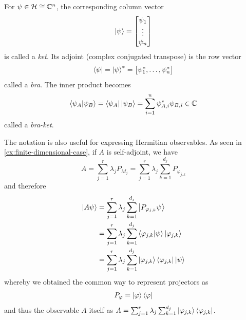 For $\psi \in \mathcal{H} \cong \mathbb{C}^n$, the corresponding column vector
\[
\ket{\psi}
=
\begin{bmatrix}
\psi_1 \\
\vdots \\
\psi_n
\end{bmatrix}
\]
is called a \emph{ket}.
Its adjoint (complex conjugated transpose) is the row vector
\[
\bra{\psi}
=
\ket{\psi}^*
=
\begin{bmatrix}
\psi_1^*,
\ldots, 
\psi_n^* 
\end{bmatrix}
\]
called a \emph{bra}.
The inner product becomes
\[
\braket{\psi_{A} | \psi_{B}}
=
\bra{\psi_{A}}  \ket{\psi_{B}}
=
\sum_{i=1}^n \psi_{A,i}^* \psi_{B,i}
\in \mathbb{C}
\]
called a \emph{bra-ket}.








The notation is also useful for expressing Hermitian observables.
As seen in \autoref{ex:finite-dimensional-case}, if $A$ is self-adjoint, we have
\[
A
=
\sum_{j=1}^r \lambda_j P_{M_j} 
=
\sum_{j=1}^r \lambda_j \sum_{k=1}^{d_j} P_{\varphi_{j,k}}
\]
and therefore
\[
\begin{aligned}
\ket{A \psi}
&=
\sum_{\smash[b]{j}=1}^r \lambda_j \sum_{k=1}^{d_j} \Ket{P_{\varphi_{j,k}} \psi} \\
&=
\sum_{\smash[b]{j}=1}^r \lambda_j \sum_{k=1}^{d_j} \braket{\varphi_{j,k}|\psi} \ket{\varphi_{j,k}} \\
&=
\sum_{j=1}^r \lambda_j \sum_{k=1}^{d_j} \ket{\varphi_{j,k}}\bra{\varphi_{j,k}} \ket{\psi}
\end{aligned}
\]
whereby we obtained the common way to represent projectors as
\[
P_{\varphi} = \ket{\varphi}\bra{\varphi}
\]
and thus the observable $A$ itself as $A = \sum_{j=1}^r \lambda_j \sum_{k=1}^{\smash{d_j}} \ket{\varphi_{j,k}}\bra{\varphi_{j,k}}$.

